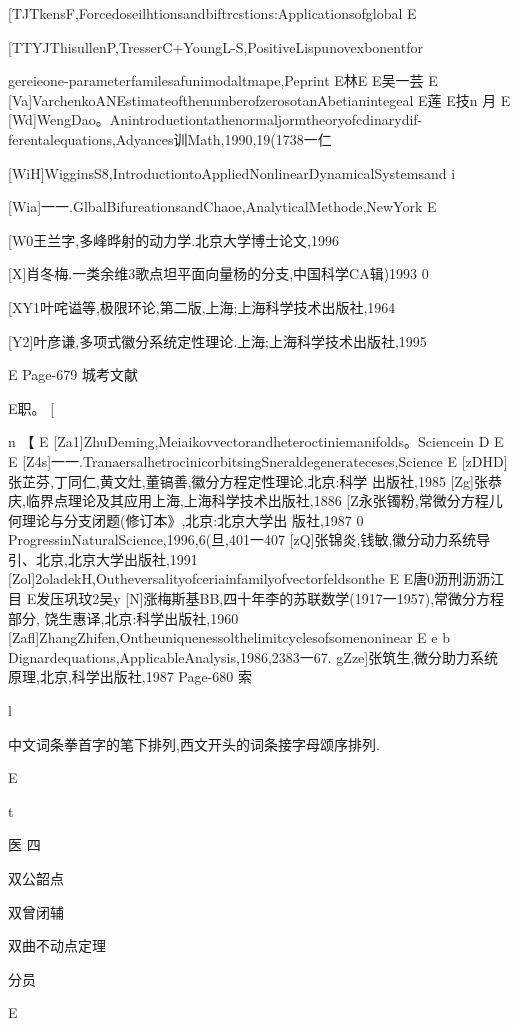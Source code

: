 [TJTkensF,Forcedoseilhtionsandbiftrcstions:Applicationsofglobal
E

[TTYJThisullenP,TresserC+YoungL-S,PositiveLispunovexbonentfor

gereieone-parameterfamilesafunimodaltmape,Peprint
E林E
E吴一芸
E
[Va]VarchenkoANEstimateofthenumberofzerosotanAbetianintegeal
E莲
E技n
月
E
[Wd]WengDao。Anintroduetiontathenormaljormtheoryofcdinarydif-
ferentalequations,Adyances训Math,1990,19(1738一仁

[WiH]WigginsS8,IntroductiontoAppliedNonlinearDynamicalSystemsand
i

[Wia]一一.GlbalBifureationsandChaoe,AnalyticalMethode,NewYork
E

[W0王兰字,多峰晔射的动力学.北京大学博士论文,1996

[X]肖冬梅.一类余维3歌点坦平面向量杨的分支,中国科学CA辑)1993
0

[XY1叶咤谥等,极限环论,第二版,上海;上海科学技术出版社,1964

[Y2]叶彦谦,多项式徽分系统定性理论.上海;上海科学技术出版社,1995

E
Page-679
城考文献

E职。
[

n
【
E
[Za1]ZhuDeming,Meiaikovvectorandheteroctiniemanifolds。Sciencein
D
E
E
[Z4s]一一.TranaersalhetrocinicorbitsingSneraldegenerateceses,Science
E
[zDHD]张芷芬,丁同仁,黄文灶,董镐善,徽分方程定性理论,北京:科学
出版社,1985
[Zg]张恭庆,临界点理论及其应用上海,上海科学技术出版社,1886
[Z永张镯粉,常微分方程儿何理论与分支闭题(修订本》,北京:北京大学出
版社,1987
0
ProgressinNaturalScience,1996,6(旦,401一407
[zQ]张锦炎,钱敏,徽分动力系统导引、北京,北京大学出版社,1991
[Zol]2oladekH,Outheversalityofceriainfamilyofvectorfeldsonthe
E
E唐0沥刑沥沥江目
E发压巩玟2吴y
[N]涨梅斯基BB,四十年李的苏联数学(1917一1957),常微分方程部分,
饶生惠译,北京:科学出版社,1960
[Zafl]ZhangZhifen,Ontheuniquenessolthelimitcyclesofsomenoninear
E
e
b
Dignardequations,ApplicableAnalysis,1986,2383一67.
gZze]张筑生,微分助力系统原理,北京,科学出版社,1987
Page-680
索

l

中文词条拳首字的笔下排列,西文开头的词条接字母颂序排列.

E

t

医
四

双公韶点

双曾闭辅

双曲不动点定理

分员

E


